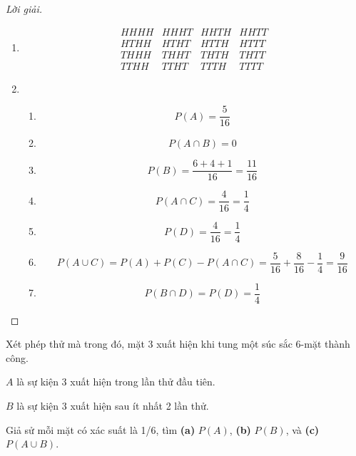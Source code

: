 \documentclass[class=probandstats,crop=false]{standalone}
\begin{document}
\begin{proof}[Lời giải]
    \begin{enumerate}[label = \textbf{(\alph*)}]
        \item
              \[
                  \begin{matrix}
                      HHHH & HHHT & HHTH & HHTT \\
                      HTHH & HTHT & HTTH & HTTT \\
                      THHH & THHT & THTH & THTT \\
                      TTHH & TTHT & TTTH & TTTT
                  \end{matrix}
              \]
        \item
              \begin{enumerate}[label = \textbf{(\arabic*)}]
                  \item
                        \[ P(A) = \dfrac{5}{16} \]
                  \item
                        \[ P(A\cap B) = 0 \]
                  \item
                        \[ P(B) = \dfrac{6 + 4 + 1}{16} = \dfrac{11}{16} \]
                  \item
                        \[ P(A\cap C) = \dfrac{4}{16} = \dfrac{1}{4} \]
                  \item
                        \[ P(D) = \dfrac{4}{16} = \dfrac{1}{4} \]
                  \item
                        \[ P(A\cup C) = P(A) + P(C) - P(A\cap C) = \dfrac{5}{16} + \dfrac{8}{16} - \dfrac{1}{4} = \dfrac{9}{16} \]
                  \item
                        \[ P(B\cap D) = P(D) = \dfrac{1}{4} \]
              \end{enumerate}
    \end{enumerate}
\end{proof}

\begin{exercise}
    \par Xét phép thử mà trong đó, mặt 3 xuất hiện khi tung một súc sắc 6-mặt thành công.
    \par $A$ là sự kiện 3 xuất hiện trong lần thử đầu tiên.
    \par $B$ là sự kiện 3 xuất hiện sau ít nhất 2 lần thử.
    \par Giả sử mỗi mặt có xác suất là 1/6, tìm \textbf{(a)} $P(A)$, \textbf{(b)} $P(B)$, và \textbf{(c)} $P(A\cup B)$.
\end{exercise}
\end{document}
